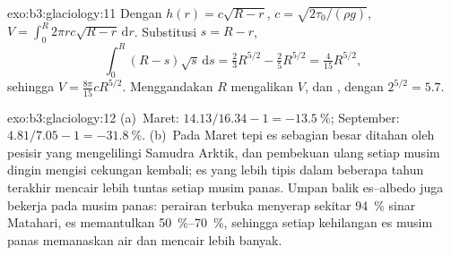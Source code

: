 \begin{solution}{exo:b3:glaciology:11}
Dengan $h(r) = c\sqrt{R - r}$, $c = \sqrt{2\tau_0/(\rho g)}$, $V =
\int_0^R2\pi rc\sqrt{R - r}\,\mathrm dr$. Substitusi $s = R - r$,
\[
\int_0^R(R - s)\sqrt s\,\mathrm ds = \tfrac23R^{5/2} - \tfrac25R^{5/2} =
\tfrac4{15}R^{5/2},
\]
sehingga $V = \frac{8\pi}{15}cR^{5/2}$. Menggandakan $R$
mengalikan $V$, dan , dengan $2^{5/2} = 5.7$.
\end{solution}

\begin{solution}{exo:b3:glaciology:12}
(a)~Maret: $14.13/16.34 - 1 = \qty{-13.5}{\percent}$; September: $4.81/7.05
- 1 = \qty{-31.8}{\percent}$. (b)~Pada Maret tepi es sebagian besar ditahan oleh
pesisir yang mengelilingi Samudra Arktik, dan pembekuan ulang setiap musim dingin
mengisi cekungan kembali; es yang lebih tipis dalam beberapa tahun terakhir mencair lebih
tuntas setiap musim panas. Umpan balik es--albedo juga bekerja pada musim panas: perairan terbuka
menyerap sekitar \qty{94}{\percent} sinar Matahari, es memantulkan
\qtyrange{50}{70}{\percent}, sehingga setiap kehilangan es musim panas memanaskan air dan
mencair lebih banyak.
\end{solution}

